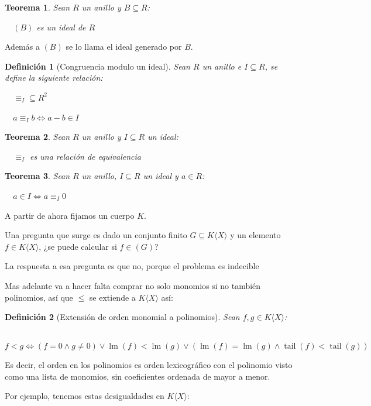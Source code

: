 \documentclass{amsbook}
\theoremstyle{customstyle}
\newtheorem{definition}{Definición}[section]
\newtheorem{theorem}{Teorema}[section]
\DeclareMathOperator{\lm}{lm}
\DeclareMathOperator{\tail}{tail}
\begin{document}
\begin{theorem}
Sean $R$ un anillo y $B ⊆ R$:

  $(B)$ es un ideal de $R$

\end{theorem}
Además a $(B)$ se lo llama el ideal generado por $B$.

\begin{definition}[Congruencia modulo un ideal]\label{def:congruencia mod ideal}
Sean $R$ un anillo e $I ⊆ R$, se define la siguiente relación:

  $≡_I ⊆ R^2$

  $a ≡_I b ⇔ a - b ∈ I$

\end{definition}

\begin{theorem}\label{thm:congruencia mod ideal es equivalencia}
Sean $R$ un anillo y $I ⊆ R$ un ideal:

  $≡_I$ es una relación de equivalencia
\end{theorem}

\begin{theorem}\label{thm:en ideal ⇔ congruente 0}
Sean $R$ un anillo, $I ⊆ R$ un ideal y $a ∈ R$:

  $a ∈ I ⇔ a ≡_I 0$
\end{theorem}


A partir de ahora fijamos un cuerpo $K$.

Una pregunta que surge es dado un conjunto finito $G ⊆ K⟨X⟩$ y un elemento $f ∈ K⟨X⟩$, ¿se puede calcular si $f ∈ (G)$?

La respuesta a esa pregunta es que no, porque el problema es indecible


Mas adelante va a hacer falta comprar no solo monomios si no también polinomios, así que $≤$ se extiende a $K⟨X⟩$ así:

\begin{definition}[Extensión de orden monomial a polinomios]
Sean $f, g ∈  K⟨X⟩$:

  $f < g ⇔ (f = 0 ∧ g ≠ 0) ∨ \lm(f) < \lm(g) ∨ (\lm(f) = \lm(g) ∧ \tail(f) < \tail(g))$

\end{definition}
Es decir, el orden en los polinomios es orden lexicográfico con el polinomio visto como una lista de monomios, sin coeficientes ordenada de mayor a menor.

Por ejemplo, tenemos estas desigualdades en $K⟨X⟩$:
\end{document}
